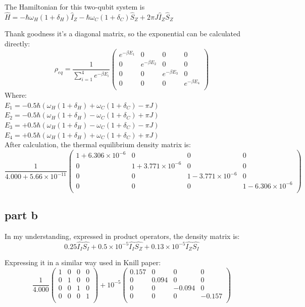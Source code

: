 \documentclass[11pt]{article}
\begin{document}
The Hamiltonian for this two-qubit system is $\hat{H} = -\hbar \omega_{H}(1+\delta_H) \hat{I}_Z -\hbar \omega_{C}(1+\delta_C) \hat{S}_Z + 2\pi J\hat{I}_Z \hat{S}_Z$

Thank goodness it's a diagonal matrix, so the exponential can be calculated directly:
\[
    \rho_{eq} = \frac{1}{\sum_{i=1}^{4}e^{-\beta E_i}}
    \begin{pmatrix}
        e^{-\beta E_1} & 0 & 0 & 0 \\
        0 & e^{-\beta E_2} & 0 & 0 \\
        0 & 0 & e^{-\beta E_3} & 0 \\
        0 & 0 & 0 & e^{-\beta E_4} \\
    \end{pmatrix}
\]
Where:\\
    $E_1 = -0.5\hbar (\omega_{H}(1+\delta_H) + \omega_{C}(1+\delta_C) - \pi J)$ \\
    $E_2 = -0.5\hbar (\omega_{H}(1+\delta_H) - \omega_{C}(1+\delta_C) + \pi J)$ \\
    $E_3 = +0.5\hbar (\omega_{H}(1+\delta_H) - \omega_{C}(1+\delta_C) - \pi J)$ \\
    $E_4 = +0.5\hbar (\omega_{H}(1+\delta_H) + \omega_{C}(1+\delta_C) + \pi J)$ \\
After calculation, the thermal equilibrium density matrix is:
\[
    \frac{1}{4.000 + 5.66\times10^{-11}}
    \begin{pmatrix}
    1+6.306\times10^{-6} & 0 & 0 & 0 \\
    0 & 1+3.771\times10^{-6} & 0 & 0 \\
    0 & 0 & 1-3.771\times10^{-6} & 0 \\
    0 & 0 & 0 & 1-6.306\times10^{-6} \\
    \end{pmatrix}
\]

\subsection*{part b}
In my understanding, expressed in product operators, the density matrix is:
\[
    0.25\hat{I_I}\hat{S_I} + 0.5\times10^{-5}\hat{I_I}\hat{S_Z} + 0.13\times10^{-5}\hat{I_Z}\hat{S_I}
\]

Expressing it in a similar way used in Knill paper: 
\[
    \frac{1}{4.000}
    \begin{pmatrix}
    1 & 0 & 0 & 0 \\
    0 & 1 & 0 & 0 \\
    0 & 0 & 1 & 0 \\
    0 & 0 & 0 & 1 \\
    \end{pmatrix}
    + 10^{-5}
    \begin{pmatrix}
        0.157 & 0 & 0 & 0 \\
        0 & 0.094 & 0 & 0 \\
        0 & 0 & -0.094 & 0 \\
        0 & 0 & 0 & -0.157 \\
    \end{pmatrix}
\]
\end{document}
